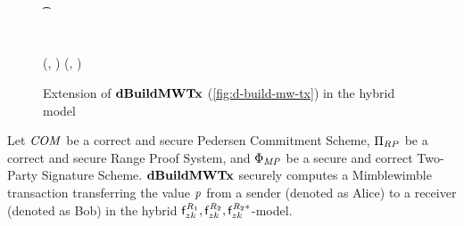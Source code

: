 \begin{figure}
\begin{center}
{\begin{varwidth}{\textwidth}
{            \pcif \color{blue}   \\
            \t \pcreturn \cnstFalsum \\
            \varTx \opFunResult \procFinTx{\funStarAlt{\varPreTx}}{\varSecKeyAlice}{\varNonceAlice} \\
            \< \sendmessageright*{\varTx} \\
            \pcreturn (\varTx, \funStar{\varSpendableCoinAlice}) \< \< \pcreturn (\varTx, \funStar{\varSpendableCoinBob})
            }
        \end{varwidth}
        }
    \end{center}
    \caption{Extension of $\mathbf{dBuildMWTx}$ (\cref{fig:d-build-mw-tx}) in the hybrid model} \label{fig:atom:hybrid-dbuild}
\end{figure}

\begin{theorem}
    \label{theo:atom:sec-tx}
    Let $\mathit{COM}$ be a correct and secure Pedersen Commitment Scheme, $\Pi_{RP}$ be a correct and secure Range Proof System, and $\Phi_{\mathit{MP}}$ be a secure and correct Two-Party Signature Scheme.
    $\mathbf{dBuildMWTx}$ securely computes a Mimblewimble transaction transferring the value $\mathit{p}$ from a sender (denoted as Alice) to a receiver (denoted as Bob) in the hybrid $\mathsf{f}^{\mathit{R}_1}_{zk}, \mathsf{f}^{\mathit{R}_2}_{zk}, \mathsf{f}^{\mathit{R}_2*}_{zk}$-model.
\end{theorem}

